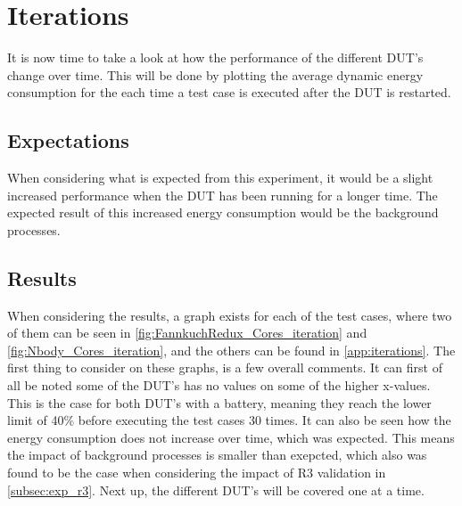 \section{Iterations}

It is now time to take a look at how the performance of the different DUT's change over time. This will be done by plotting the average dynamic energy consumption for the each time a test case is executed after the DUT is restarted.

\subsection{Expectations}

When considering what is expected from this experiment, it would be a slight increased performance when the DUT has been running for a longer time. The expected result of this increased energy consumption would be the background processes. 

\subsection{Results} 

When considering the results, a graph exists for each of the test cases, where two of them can be seen in \cref{fig:FannkuchRedux_Cores_iteration} and \cref{fig:Nbody_Cores_iteration}, and the others can be found in \cref{app:iterations}. The first thing to consider on these graphs, is a few overall comments. It can first of all be noted some of the DUT's has no values on some of the higher x-values. This is the case for both DUT's with a battery, meaning they reach the lower limit of 40\% before executing the test cases 30 times. It can also be seen how the energy consumption does not increase over time, which was expected. This means the impact of background processes is smaller than exepcted, which also was found to be the case when considering the impact of R3 validation in \cref{subsec:exp_r3}.  Next up, the different DUT's will be covered one at a time.

